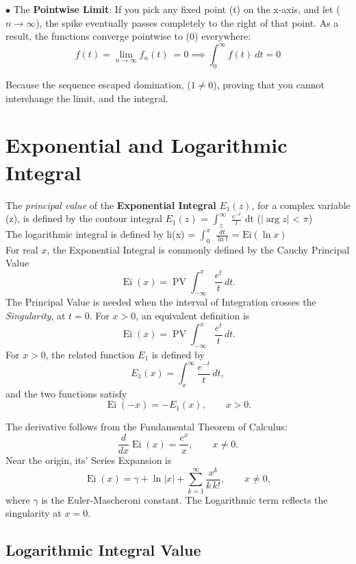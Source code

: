 \documentclass[a4paper, 10pt, onepage]{elegantbook}
\begin{document}
$\bullet$ The \textbf{Pointwise Limit}: If you pick any fixed point (t) on the x-axis, and let ($n \to \infty$), the spike eventually passes completely to the right of that point. As a result, the functions converge pointwise to (0) everywhere:  \\

\[
f(t) = \lim_{n \to \infty} f_n (t) \ = 0 \implies \int_0^\infty f(t) \ dt = 0
\]

Because the sequence escaped domination, ($1 \neq 0$), proving that you cannot interchange the limit, and the integral.



\section{Exponential and Logarithmic Integral}

The \emph{principal value} of the \textbf{Exponential Integral} $E_1(z)$, for a complex variable (z), is defined by the contour integral  $E_1(z)$ = $\int_{z}^{\infty}$ $\frac{e^{-t}}{t}$ dt \quad ($\vert \arg z \vert$ < $\pi$)  \\

The logarithmic integral is defined by $\text{li}$(x) = $\int_{0}^{x}$ $\frac{dt}{\ln t}$ = $\text{Ei}(\ln x)$  \\

For real \(x\), the Exponential Integral is commonly defined by the Cauchy Principal Value
\[
\operatorname{Ei}(x)
=\operatorname{PV}\int_{-\infty}^{x}\frac{e^t}{t}\,dt.
\]
The Principal Value is needed when the interval of Integration crosses the \emph{Singularity}, at \(t=0\). For \(x>0\), an equivalent definition is
\[
\operatorname{Ei}(x)
=\operatorname{PV}\int_{-\infty}^{x}\frac{e^t}{t}\,dt.
\]
For \(x>0\), the related function \(E_1\) is defined by
\[
E_1(x)=\int_x^\infty \frac{e^{-t}}{t}\,dt,
\]
and the two functions satisfy
\[
\operatorname{Ei}(-x)=-E_1(x),\qquad x>0.
\]

The derivative follows from the Fundamental Theorem of Calculus:
\[
\frac{d}{dx}\operatorname{Ei}(x)=\frac{e^x}{x},
\qquad x\ne 0.
\]
Near the origin, its' Series Expansion is
\[
\operatorname{Ei}(x)
=\gamma+\ln|x|
+\sum_{k=1}^{\infty}\frac{x^k}{k\,k!},
\qquad x\ne 0,
\]
where \(\gamma\) is the Euler-Mascheroni constant. The Logarithmic term reflects the singularity at \(x=0\).

\subsection{Logarithmic Integral Value}
\end{document}
